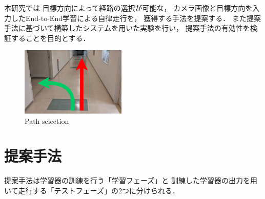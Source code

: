 \documentclass[10pt]{jarticle}
\begin{document}
    本研究では
    目標方向によって経路の選択が可能な，
    カメラ画像と目標方向を入力したEnd-to-End学習による自律走行を，
    獲得する手法を提案する．
    また提案手法に基づいて構築したシステムを用いた実験を行い，
    提案手法の有効性を検証することを目的とする．
    \begin{center}
        \begin{figure}[h]
            \centering
            \includegraphics[width=5cm]{./fig/zyuzibunki.png}
            \caption{Path selection}
            \label{fig:bunki}
        \end{figure}
    \end{center}
    \section{提案手法}%
    提案手法は学習器の訓練を行う「学習フェーズ」と
    訓練した学習器の出力を用いて走行する「テストフェーズ」の2つに分けられる．
    
\end{document}
